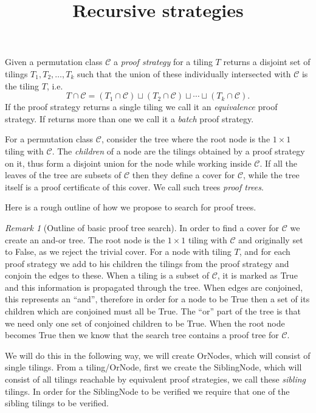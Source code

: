 \documentclass{amsart}
\title{Recursive strategies}
\theoremstyle{definition}
\theoremstyle{remark}
\newtheorem{rmk}{Remark}
\newcommand{\mcC}{\mathcal{C}}
\begin{document}
\maketitle

Given a permutation class $\mcC$ a \emph{proof strategy} for a tiling $T$
returns a disjoint set of tilings $T_1, T_2, \ldots, T_k$ such that the union of
these individually intersected with $\mcC$ is the tiling $T$, i.e.
\[
  T \cap \mcC = ( T_1 \cap \mcC ) \sqcup ( T_2 \cap \mcC ) \sqcup \cdots \sqcup (T_k \cap \mcC).
\]
If the proof strategy returns a single tiling we call it an \emph{equivalence}
proof strategy. If returns more than one we call it a \emph{batch} proof
strategy.

For a permutation class $\mcC$, consider the tree where the root node is the $1
\times 1$ tiling with $\mcC$. The \emph{children} of a node are the tilings
obtained by a proof strategy on it, thus form a disjoint union for the node
while working inside $\mcC$. If all the leaves of the tree are subsets of $\mcC$
then they define a cover for $\mcC$, while the tree itself is a proof
certificate of this cover. We call such trees \emph{proof trees}.

Here is a rough outline of how we propose to search for proof trees.

\begin{rmk}[Outline of basic proof tree search]
  In order to find a cover for $\mcC$ we create an and-or tree. The root node is
  the $1 \times 1$ tiling with $\mcC$ and originally set to \textsf{False}, as
  we reject the trivial cover. For a node with tiling $T$, and for each proof
  strategy we add to his children the tilings from the proof strategy and
  conjoin the edges to these. When a tiling is a subset of $\mcC$, it is marked
  as \textsf{True} and this information is propagated through the tree. When
  edges are conjoined, this represents an ``and'', therefore in order for a node
  to be \textsf{True} then a set of its children which are conjoined must all be
  \textsf{True}. The ``or'' part of the tree is that we need only one set of
  conjoined children to be \textsf{True}. When the root node becomes
  \textsf{True} then we know that the search tree contains a proof tree for
  $\mcC$.
\end{rmk}

We will do this in the following way, we will create OrNodes, which will consist
of single tilings. From a tiling/OrNode, first we create the SiblingNode, which
will consist of all tilings reachable by equivalent proof strategies, we call
these \emph{sibling} tilings. In order for the SiblingNode to be verified we
require that one of the sibling tilings to be verified.
\end{document}
